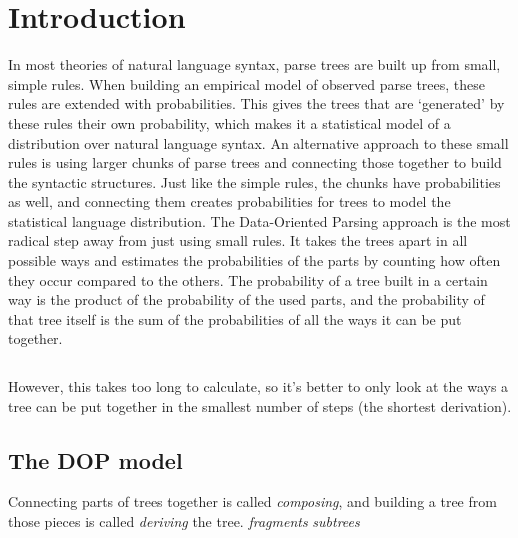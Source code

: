 
\section{Introduction}




In most theories of natural language syntax, parse trees are built up from small, simple rules. 
When building an empirical model of observed parse trees, these rules are extended with probabilities. This gives the trees that are `generated' by these rules their own probability, which makes it a statistical model of a distribution over natural language syntax.
An alternative approach to these small rules is using larger chunks of parse trees and connecting those together to build the syntactic structures. 
Just like the simple rules, the chunks have probabilities as well, and connecting them creates probabilities for trees to model the statistical language distribution.
The Data-Oriented Parsing approach is the most radical step away from just using small rules. It takes the trees apart in all possible ways and estimates the probabilities of the parts by counting how often they occur compared to the others. The probability of a tree built in a certain way is the product of the probability of the used parts, and the probability of that tree itself is the sum of the probabilities of all the ways it can be put together. %

$$$$

However, this takes too long to calculate, so it's better to only look at the ways a tree can be put together in the smallest number of steps (the shortest derivation).

\subsection{The DOP model}

Connecting parts of trees together is called \emph{composing}, and building a tree from those pieces is called \emph{deriving} the tree.
\emph{fragments}
\emph{subtrees}
